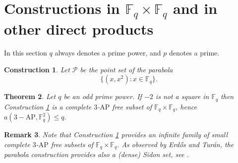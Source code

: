\documentclass[11pt]{article}
\numberwithin{table}{section}
\newcommand{\F}{{\mathbb F}}
\newtheorem{theorem}{Theorem}[section]
\newtheorem{remark}[theorem]{Remark}
\newtheorem{constr}[theorem]{\bf Construction}
\newtheorem{cor}[theorem]{\bf Corollary}
\theoremstyle{definition}
\DeclareMathOperator{\PG}{{PG}}
\DeclareMathOperator{\AG}{{AG}}
\begin{document}
	
	
	\section{\texorpdfstring{Constructions in $\F_q \times \F_q$ and in other direct products}{Construction in Fq x Fq and in other direct products}} %
	
	In this section $q$ always denotes a prime power, and $p$ denotes a prime.
	
	
	\begin{constr}\label{parabola}
		Let $\mathcal{P}$ be the point set of the parabola 
		\[\{(x,x^2) : x \in \F_q\}.\]
	\end{constr}
	
	\begin{theorem}\label{main1} Let $q$ be an odd prime power.
		If $-2$ is not a square in $\F_q$ then Construction \ref{parabola} is a complete $3$-$\mathrm{AP}$ free subset of $\F_q\times \F_q$, hence $a(3-\mathrm{AP}, \F_q^2)\leq q.$
	\end{theorem}
	\begin{remark}
		Note that  Construction \ref{parabola} provides an infinite family of small complete $3$-$\mathrm{AP}$ free subsets of $\F_q\times \F_q$.
		As observed by Erdős and Turán, the parabola construction provides also a (dense) Sidon set, see \cite{Eber, ET}.
	\end{remark} 
	
	
\end{document}
